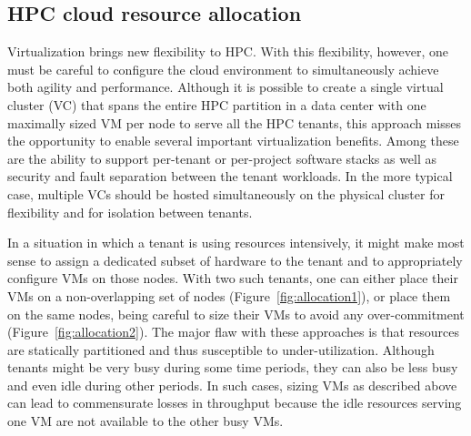 
\subsection{HPC cloud resource allocation}
Virtualization brings new flexibility to HPC. With this flexibility, however, one must be careful to configure 
the cloud environment to simultaneously achieve both agility and performance.
Although it is possible to create a single virtual cluster (VC) that spans the entire HPC partition in a data center 
with one maximally sized VM per node to serve all the HPC tenants, this approach misses the opportunity to enable several important 
virtualization benefits. Among these are the ability to support per-tenant or per-project software stacks as well 
as security and fault separation between the tenant workloads. In the more typical case, multiple VCs should be hosted simultaneously on the physical cluster for flexibility and for isolation between tenants.

In a situation in which a tenant is using resources intensively, it might make most sense to assign 
a dedicated subset of hardware to the tenant and to appropriately configure VMs on those nodes. 
With two such tenants, one can either place their VMs on a non-overlapping set of nodes (Figure~\ref{fig:allocation1}), 
or place them on the same nodes, being careful to size their VMs to avoid any over-commitment (Figure~\ref{fig:allocation2}). 
The major flaw with these approaches is that resources are statically partitioned and thus susceptible to under-utilization. 
Although tenants might be very busy during some 
time periods, they can also be less busy and even idle during other periods. In such cases, sizing VMs as 
described above can lead to commensurate losses in 
throughput because the idle resources serving one VM are not available to the other busy VMs.

